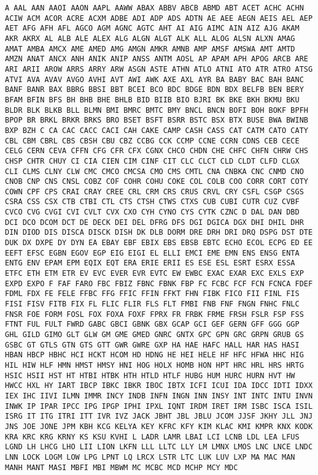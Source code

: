 \documentclass[11pt]{article}
\begin{document}
    \begin{Verbatim}[commandchars=\\\{\}]
A AAL AAN AAOI AAON AAPL AAWW ABAX ABBV ABCB ABMD ABT ACET ACHC ACHN ACIW ACM ACOR ACRE ACXM ADBE ADI ADP ADS ADTN AE AEE AEGN AEIS AEL AEP AET AFG AFH AFL AGCO AGM AGNC AGTC AHT AI AIG AIMC AIN AIZ AJG AKAM AKR AKRX AL ALB ALE ALEX ALG ALGN ALGT ALK ALL ALOG ALSN ALXN AMAG AMAT AMBA AMCX AME AMED AMG AMGN AMKR AMNB AMP AMSF AMSWA AMT AMTD AMZN ANAT ANCX ANH ANIK ANIP ANSS ANTM AOSL AP APAM APH APOG ARCB ARE ARI ARII AROW ARRS ARRY ARW ASGN ASTE ATHN ATLO ATNI ATO ATR ATRO ATSG ATVI AVA AVAV AVGO AVHI AVT AWI AWK AXE AXL AYR BA BABY BAC BAH BANC BANF BANR BAX BBRG BBSI BBT BCEI BCO BDC BDGE BDN BDX BELFB BEN BERY BFAM BFIN BFS BH BHB BHE BHLB BID BIIB BIO BJRI BK BKE BKH BKMU BKU BLDR BLK BLKB BLL BLMN BMI BMRC BMTC BMY BNCL BNCN BOFI BOH BOKF BPFH BPOP BR BRKL BRKR BRKS BRO BSET BSFT BSRR BSTC BSX BTX BUSE BWA BWINB BXP BZH C CA CAC CACC CACI CAH CAKE CAMP CASH CASS CAT CATM CATO CATY CBL CBM CBRL CBS CBSH CBU CBZ CCBG CCK CCMP CCNE CCRN CDNS CEB CECE CELG CERN CEVA CFFN CFG CFR CFX CGNX CHCO CHDN CHE CHFC CHFN CHRW CHS CHSP CHTR CHUY CI CIA CIEN CIM CINF CIT CLC CLCT CLD CLDT CLFD CLGX CLI CLMS CLNY CLW CMC CMCO CMCSA CMO CMS CMTL CNA CNBKA CNC CNMD CNO CNOB CNP CNS CNSL COBZ COF COHR COHU COKE COL COLB COO CORR CORT COTY COWN CPF CPS CRAI CRAY CREE CRL CRM CRS CRUS CRVL CRY CSFL CSGP CSGS CSRA CSS CSX CTB CTBI CTL CTS CTSH CTWS CTXS CUB CUBI CUTR CUZ CVBF CVCO CVG CVGI CVI CVLT CVX CXO CYH CYNO CYS CYTK CZNC D DAL DAN DBD DCI DCO DCOM DCT DE DECK DEI DEL DFRG DFS DGI DGICA DGX DHI DHIL DHR DIN DIOD DIS DISCA DISCK DISH DK DLB DORM DRE DRH DRI DRQ DSPG DST DTE DUK DX DXPE DY DYN EA EBAY EBF EBIX EBS EBSB EBTC ECHO ECOL ECPG ED EE EEFT EFSC EGBN EGOV EGP EIG EIGI EL ELLI EMCI EME EMN ENS ENSG ENTA ENTG ENV EPAM EPM EQIX EQT ERA ERIE ERII ES ESE ESL ESRT ESRX ESSA ETFC ETH ETM ETR EV EVC EVER EVR EVTC EW EWBC EXAC EXAR EXC EXLS EXP EXPD EXPO F FAF FARO FBC FBIZ FBNC FBNK FBP FC FCBC FCF FCN FCNCA FDEF FDML FDX FE FELE FFBC FFG FFIC FFIN FFKT FHN FIBK FICO FII FINL FIS FISI FISV FITB FIX FL FLIC FLIR FLS FLT FMBI FNB FNF FNGN FNHC FNLC FNSR FOE FORM FOSL FOX FOXA FOXF FPRX FR FRBK FRME FRSH FSLR FSP FSS FTNT FUL FULT FWRD GABC GBCI GBNK GBX GCAP GCI GEF GERN GFF GGG GGP GHL GILD GIMO GLT GLW GM GME GMED GNRC GNTX GPC GPN GRC GRPN GRUB GS GSBC GT GTLS GTN GTS GTT GWR GWRE GXP HA HAE HAFC HALL HAR HAS HASI HBAN HBCP HBHC HCI HCKT HCOM HD HDNG HE HEI HELE HF HFC HFWA HHC HIG HIL HIW HLF HMN HMST HMSY HNI HOG HOLX HOMB HON HPT HRC HRL HRS HRTG HSIC HSII HST HT HTBI HTBK HTH HTLD HTLF HUBG HUM HURC HURN HVT HW HWCC HXL HY IART IBCP IBKC IBKR IBOC IBTX ICFI ICUI IDA IDCC IDTI IDXX IEX IHC IIVI ILMN IMMR INCY INDB INFN INGN INN INSY INT INTC INTU INVN INWK IP IPAR IPCC IPG IPGP IPHI IPXL IQNT IRDM IRET IRM ISBC ISCA ISIL ISRG IT ITG ITRI ITT IVR IVZ JACK JBHT JBL JBLU JCOM JJSF JKHY JLL JNJ JNS JOE JONE JPM KBH KCG KELYA KEY KFRC KFY KIM KLAC KMI KMPR KNX KODK KRA KRC KRG KRNY KS KSU KVHI L LADR LAMR LBAI LCI LCNB LDL LEA LFUS LGND LH LHCG LHO LII LION LKFN LLL LLTC LLY LM LMNX LMOS LNC LNCE LNDC LNN LOCK LOGM LOW LPG LPNT LQ LRCX LSTR LTC LUK LUV LXP MA MAC MAN MANH MANT MASI MBFI MBI MBWM MC MCBC MCD MCHP MCY MDC 
\end{Verbatim}
\end{document}
